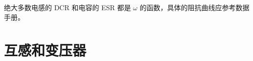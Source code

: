 \documentclass[UTF8]{report}
\theoremstyle{MyLineTheoremStyle} %
\theoremstyle{MyBlockTheoremStyle} %
\theoremstyle{MySubsubsectionStyle} %
\begin{document}
绝大多数电感的 DCR 和电容的 ESR 都是 $\omega$ 的函数，具体的阻抗曲线应参考数据手册。


\section{互感和变压器}
\end{document}
